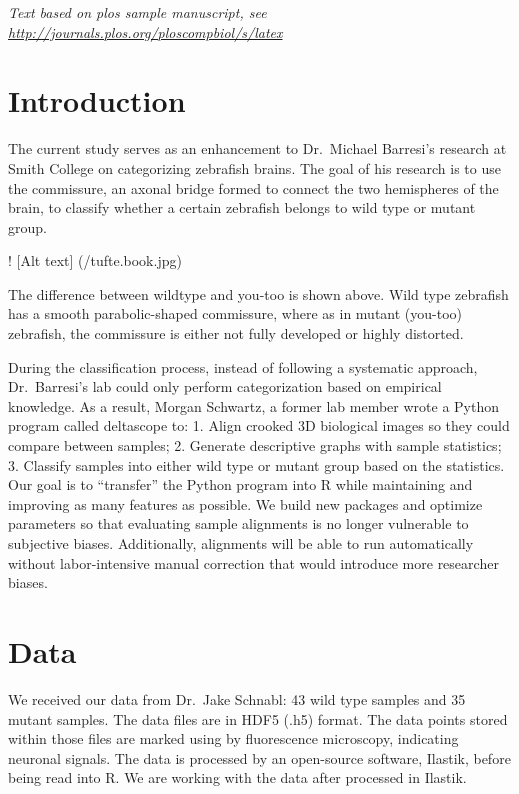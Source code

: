 \documentclass[10pt,letterpaper]{article}
\begin{document}
\linenumbers

\emph{Text based on plos sample manuscript, see
\url{http://journals.plos.org/ploscompbiol/s/latex}}

\hypertarget{introduction}{%
\section{Introduction}\label{introduction}}

The current study serves as an enhancement to Dr.~Michael Barresi's
research at Smith College on categorizing zebrafish brains. The goal of
his research is to use the commissure, an axonal bridge formed to
connect the two hemispheres of the brain, to classify whether a certain
zebrafish belongs to wild type or mutant group.

! {[}Alt text{]} (/tufte.book.jpg)

The difference between wildtype and you-too is shown above. Wild type
zebrafish has a smooth parabolic-shaped commissure, where as in mutant
(you-too) zebrafish, the commissure is either not fully developed or
highly distorted.

During the classification process, instead of following a systematic
approach, Dr.~Barresi's lab could only perform categorization based on
empirical knowledge. As a result, Morgan Schwartz, a former lab member
wrote a Python program called deltascope to: 1. Align crooked 3D
biological images so they could compare between samples; 2. Generate
descriptive graphs with sample statistics; 3. Classify samples into
either wild type or mutant group based on the statistics. Our goal is to
``transfer'' the Python program into R while maintaining and improving
as many features as possible. We build new packages and optimize
parameters so that evaluating sample alignments is no longer vulnerable
to subjective biases. Additionally, alignments will be able to run
automatically without labor-intensive manual correction that would
introduce more researcher biases.

\hypertarget{data}{%
\section{Data}\label{data}}

We received our data from Dr.~Jake Schnabl: 43 wild type samples and 35
mutant samples. The data files are in HDF5 (.h5) format. The data points
stored within those files are marked using by fluorescence microscopy,
indicating neuronal signals. The data is processed by an open-source
software, Ilastik, before being read into R. We are working with the
data after processed in Ilastik.
\end{document}
